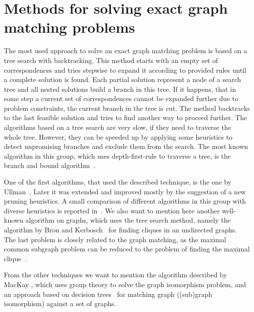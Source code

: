 \section{Methods for solving exact graph matching problems}
The most used approach to solve an exact graph matching problem is based on a tree search with backtracking. This method starts with an empty set of correspondences and tries stepwise to expand it according to provided rules until a complete solution is found. Each partial solution represent a node of a search tree and all nested solutions build a branch in this tree. If it happens, that in some step a current set of correspondences cannot be expanded further due to problem constraints, the current branch in the tree is cut. The method backtracks to the last feasible solution and tries to find another way to proceed further. The algorithms based on a tree search are very slow, if they need to traverse the whole tree. However, they can be speeded up by applying some heuristics to detect unpromising branches and exclude them from the search. The most known algorithm in this group, which uses depth-first-rule to traverse a tree, is the branch and bound algorithm~\cite{Reingold}.

One of the first algorithms, that used the described technique, is the one by Ullman~\cite{Ullmann}. Later it was extended and improved mostly by the suggestion of a new pruning heuristics. A small comparison of different algorithms in this group with diverse heuristics is reported in~\cite{Lee2013}. We also want to mention here another well-known algorithm on graphs, which uses the tree search method, namely the algorithm by Bron and Kerbosch~\cite{BronKerbosch} for finding cliques in an undirected graphs. The last problem is closely related to the graph matching, as the maximal common subgraph problem can be reduced to the problem of finding the maximal clique~\cite{Garey_NPComplet}.

From the other techniques we want to mention the algorithm described by MacKay \cite{McKay}, which uses group theory to solve the graph isomorphism problem, and an approach based on decision trees~\cite{Messmer1999,Shearer2001,Shearer1998} for matching graph ((sub)graph isomorphism) against a set of graphs.
